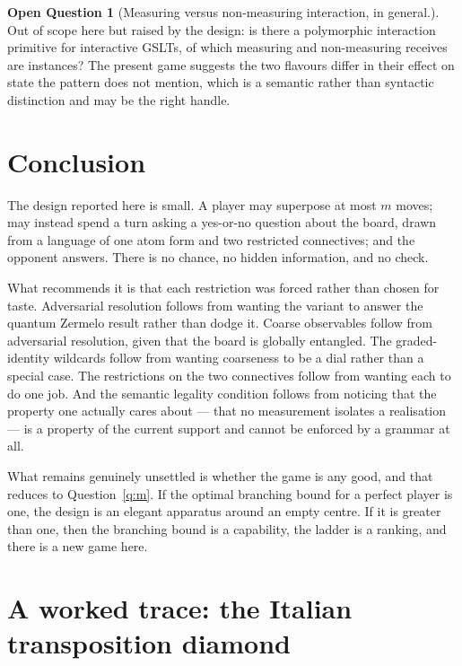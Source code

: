 \documentclass[11pt,a4paper]{article}
\theoremstyle{definition}
\newtheorem{question}{Open Question}
\theoremstyle{plain}
\begin{document}
\begin{question}[Measuring versus non-measuring interaction, in general.]
\label{q:polymorphic}
Out of scope here but raised by the design: is there a polymorphic interaction
primitive for interactive GSLTs, of which measuring and non-measuring receives
are instances? The present game suggests the two flavours differ in their
effect on state the pattern does not mention, which is a semantic rather than
syntactic distinction and may be the right handle.
\end{question}

\section{Conclusion}

The design reported here is small. A player may superpose at most $m$ moves;
may instead spend a turn asking a yes-or-no question about the board, drawn
from a language of one atom form and two restricted connectives; and the
opponent answers. There is no chance, no hidden information, and no check.

What recommends it is that each restriction was forced rather than chosen for
taste. Adversarial resolution follows from wanting the variant to answer the
quantum Zermelo result rather than dodge it. Coarse observables follow from
adversarial resolution, given that the board is globally entangled. The
graded-identity wildcards follow from wanting coarseness to be a dial rather
than a special case. The restrictions on the two connectives follow from
wanting each to do one job. And the semantic legality condition follows from
noticing that the property one actually cares about --- that no measurement
isolates a realisation --- is a property of the current support and cannot be
enforced by a grammar at all.

What remains genuinely unsettled is whether the game is any good, and that
reduces to Question~\ref{q:m}. If the optimal branching bound for a perfect
player is one, the design is an elegant apparatus around an empty centre. If it
is greater than one, then the branching bound is a capability, the ladder is a
ranking, and there is a new game here.

\appendix

\section{A worked trace: the Italian transposition diamond}
\label{app:trace}
\end{document}
